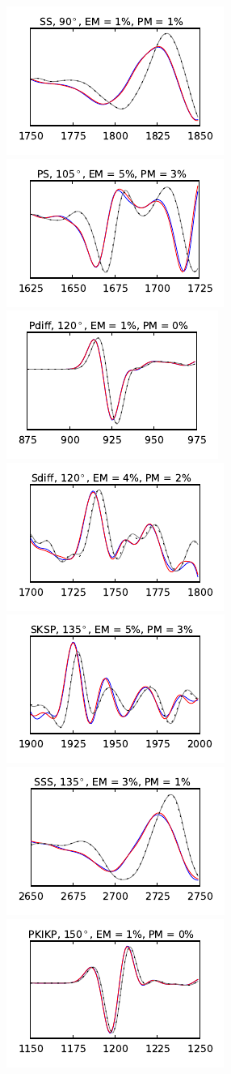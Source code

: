 \documentclass[extra,referee]{gji}
\begin{document}
\begin{figure}
  \includegraphics[width=.25\textwidth]{fig/section/8.pdf}\vspace{-5pt}
  \includegraphics[width=.25\textwidth]{fig/section/9.pdf}\hspace{-5pt}
  \includegraphics[width=.25\textwidth]{fig/section/10.pdf}\hspace{-5pt}
  \includegraphics[width=.25\textwidth]{fig/section/11.pdf}\hspace{-5pt}
  \includegraphics[width=.25\textwidth]{fig/section/12.pdf}\vspace{-5pt}
  \includegraphics[width=.25\textwidth]{fig/section/13.pdf}\hspace{-5pt}
  \includegraphics[width=.25\textwidth]{fig/section/14.pdf}\hspace{-5pt}

\end{figure}
\end{document}
